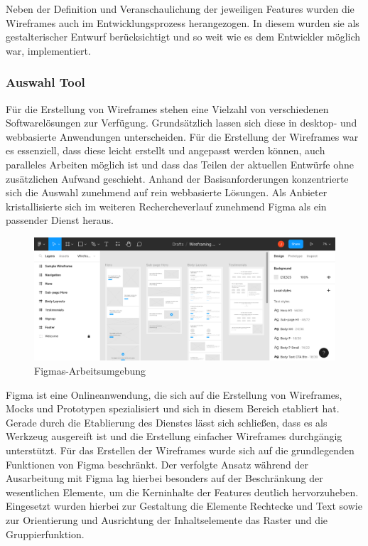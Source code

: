 
Neben der Definition und Veranschaulichung der jeweiligen Features wurden die Wireframes auch im Entwicklungsprozess herangezogen. In diesem wurden sie als gestalterischer Entwurf berücksichtigt und so weit wie es dem Entwickler möglich war, implementiert.

\subsubsection{Auswahl Tool}

Für die Erstellung von Wireframes stehen eine Vielzahl von verschiedenen Softwarelösungen zur Verfügung. Grundsätzlich lassen sich diese in desktop- und webbasierte Anwendungen unterscheiden. Für die Erstellung der Wireframes war es essenziell, dass diese leicht erstellt und angepasst werden können, \ggf auch paralleles Arbeiten möglich ist und dass das Teilen der aktuellen Entwürfe ohne zusätzlichen Aufwand geschieht. Anhand der Basisanforderungen konzentrierte sich die Auswahl zunehmend auf rein webbasierte Lösungen. Als Anbieter kristallisierte sich im weiteren Rechercheverlauf zunehmend Figma als ein passender Dienst heraus.

\begin{figure}
    \centering
    \includegraphics[width=\textwidth]{figures/jan/Wire_Figma.png}
    \caption[Figmas-Arbeitsumgebung]{Figmas-Arbeitsumgebung}
    \label{fig:figma}
\end{figure}

Figma ist eine Onlineanwendung, die sich auf die Erstellung von Wireframes, Mocks und Prototypen spezialisiert und sich in diesem Bereich etabliert hat. Gerade durch die Etablierung des Dienstes lässt sich schließen, dass es als Werkzeug ausgereift ist und die Erstellung einfacher Wireframes durchgängig unterstützt.
Für das Erstellen der Wireframes wurde sich auf die grundlegenden Funktionen von Figma beschränkt. Der verfolgte Ansatz während der Ausarbeitung mit Figma lag hierbei besonders auf der Beschränkung der wesentlichen Elemente, um die Kerninhalte der Features deutlich hervorzuheben. Eingesetzt wurden hierbei \ua zur Gestaltung die Elemente Rechtecke und Text sowie zur Orientierung und Ausrichtung der Inhaltselemente das Raster und die Gruppierfunktion.

